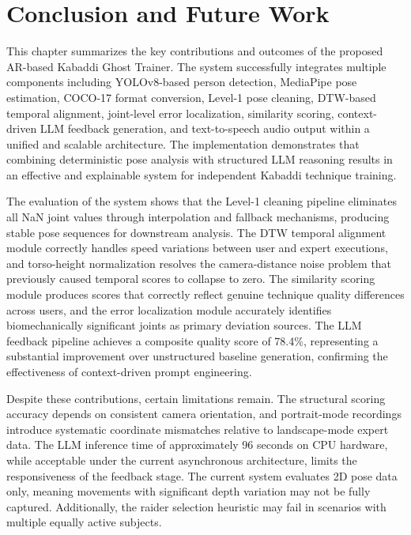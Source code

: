 \chapter{Conclusion and Future Work}
\begin{sloppypar}

This chapter summarizes the key contributions and outcomes of the proposed AR-based Kabaddi Ghost Trainer. The system successfully integrates multiple components including YOLOv8-based person detection, MediaPipe pose estimation, COCO-17 format conversion, Level-1 pose cleaning, DTW-based temporal alignment, joint-level error localization, similarity scoring, context-driven LLM feedback generation, and text-to-speech audio output within a unified and scalable architecture. The implementation demonstrates that combining deterministic pose analysis with structured LLM reasoning results in an effective and explainable system for independent Kabaddi technique training.

The evaluation of the system shows that the Level-1 cleaning pipeline eliminates all NaN joint values through interpolation and fallback mechanisms, producing stable pose sequences for downstream analysis. The DTW temporal alignment module correctly handles speed variations between user and expert executions, and torso-height normalization resolves the camera-distance noise problem that previously caused temporal scores to collapse to zero. The similarity scoring module produces scores that correctly reflect genuine technique quality differences across users, and the error localization module accurately identifies biomechanically significant joints as primary deviation sources. The LLM feedback pipeline achieves a composite quality score of 78.4\%, representing a substantial improvement over unstructured baseline generation, confirming the effectiveness of context-driven prompt engineering.

Despite these contributions, certain limitations remain. The structural scoring accuracy depends on consistent camera orientation, and portrait-mode recordings introduce systematic coordinate mismatches relative to landscape-mode expert data. The LLM inference time of approximately 96 seconds on CPU hardware, while acceptable under the current asynchronous architecture, limits the responsiveness of the feedback stage. The current system evaluates 2D pose data only, meaning movements with significant depth variation may not be fully captured. Additionally, the raider selection heuristic may fail in scenarios with multiple equally active subjects.



\end{sloppypar}

